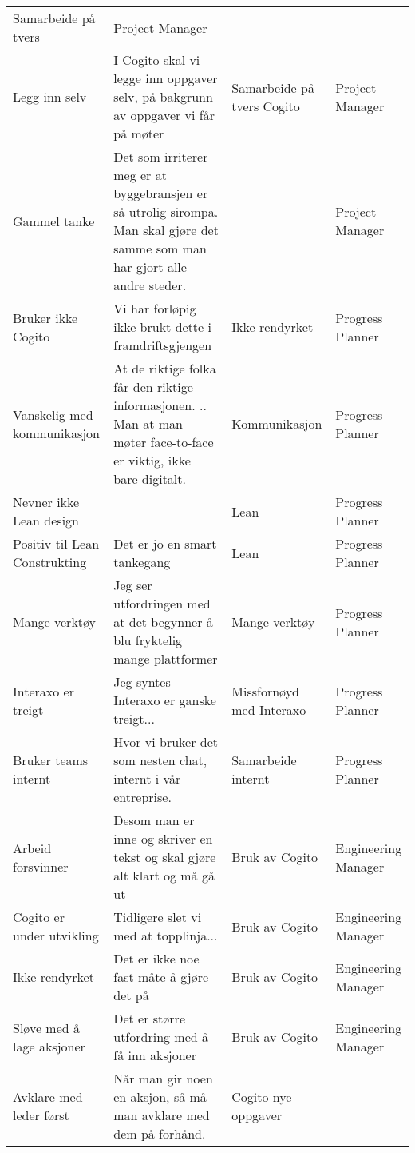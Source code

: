 \begin{landscape}
\begin{longtable}{p{0.25\textheight}p{0.5\textheight}p{0.25\textheight}p{0.25\textheight}}
      Samarbeide på tvers &
      Project Manager \\
    Legg inn selv &
      I Cogito skal vi legge inn oppgaver selv, på bakgrunn av oppgaver vi får på møter &
      Samarbeide på tvers Cogito &
      Project Manager \\
    Gammel tanke &
      Det som irriterer meg er at byggebransjen er så utrolig sirompa. Man skal gjøre det samme som man har gjort alle andre steder. &
       &
      Project Manager \\
    Bruker ikke Cogito &
      Vi har forløpig ikke brukt dette i framdriftsgjengen &
      Ikke rendyrket &
      Progress Planner \\
    Vanskelig med kommunikasjon &
      At de riktige folka får den riktige informasjonen. .. Man at man møter face-to-face er viktig, ikke bare digitalt. &
      Kommunikasjon &
      Progress Planner \\
    Nevner ikke Lean design &
       &
      Lean &
      Progress Planner \\
    Positiv til Lean Construkting &
      Det er jo en smart tankegang &
      Lean &
      Progress Planner \\
    Mange verktøy &
      Jeg ser utfordringen med at det begynner å blu fryktelig mange plattformer &
      Mange verktøy &
      Progress Planner \\
    Interaxo er treigt &
      Jeg syntes Interaxo er ganske treigt... &
      Missfornøyd med Interaxo &
      Progress Planner \\
    Bruker teams internt &
      Hvor vi bruker det som nesten chat, internt i vår entreprise. &
      Samarbeide internt &
      Progress Planner \\
    Arbeid forsvinner &
      Desom man er inne og skriver en tekst og skal gjøre alt klart og må gå ut &
      Bruk av Cogito &
      Engineering Manager \\
    Cogito er under utvikling &
      Tidligere slet vi med at topplinja... &
      Bruk av Cogito &
      Engineering Manager \\
    Ikke rendyrket &
      Det er ikke noe fast måte å gjøre det på &
      Bruk av Cogito &
      Engineering Manager \\
    Sløve med å lage aksjoner &
      Det er større utfordring med å få inn aksjoner &
      Bruk av Cogito &
      Engineering Manager \\
    Avklare med leder først &
      Når man gir noen en aksjon, så må man avklare med dem på forhånd. &
      Cogito nye oppgaver &

\end{longtable}
\end{landscape}
